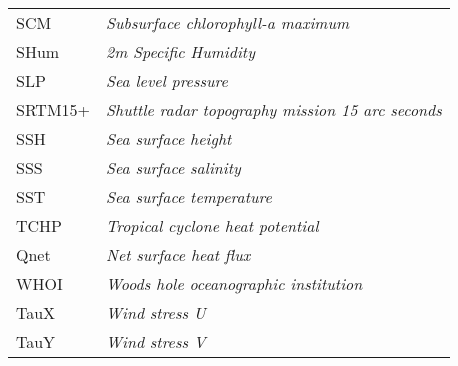 \begin{tabular}{ll}
		SCM & \textit{Subsurface chlorophyll-a maximum}\\
		SHum & \textit{2m Specific Humidity}\\
		SLP & \textit{Sea level pressure}\\
		SRTM15+ & \textit{Shuttle radar topography mission 15 arc seconds}\\
		SSH & \textit{Sea surface height} \\
		SSS & \textit{Sea surface salinity} \\
		SST & \textit{Sea surface temperature}\\
		TCHP & \textit{Tropical cyclone heat potential} \\
		Qnet & \textit{Net surface heat flux} \\
		WHOI & \textit{Woods hole oceanographic institution} \\
		TauX & \textit{Wind stress U}\\
		TauY & \textit{Wind stress V}\\
	\end{tabular}
